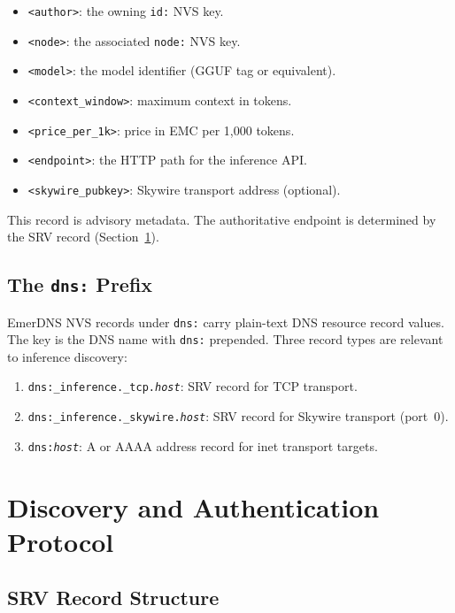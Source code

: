 \documentclass[11pt,a4paper]{article}
\theoremstyle{definition}
\begin{document}
\begin{itemize}
  \item \texttt{<author>}: the owning \texttt{id:} NVS key.
  \item \texttt{<node>}: the associated \texttt{node:} NVS key.
  \item \texttt{<model>}: the model identifier (GGUF tag or equivalent).
  \item \texttt{<context\_window>}: maximum context in tokens.
  \item \texttt{<price\_per\_1k>}: price in EMC per 1,000 tokens.
  \item \texttt{<endpoint>}: the HTTP path for the inference API.
  \item \texttt{<skywire\_pubkey>}: Skywire transport address (optional).
\end{itemize}

This record is advisory metadata.  The authoritative endpoint is determined by
the SRV record (Section~\ref{sec:discovery}).

\subsection{The \texttt{dns:} Prefix}

EmerDNS NVS records under \texttt{dns:} carry plain-text DNS resource record
values.  The key is the DNS name with \texttt{dns:} prepended.  Three record
types are relevant to inference discovery:

\begin{enumerate}
  \item \texttt{dns:\_inference.\_tcp.\textit{host}}: SRV record for TCP transport.
  \item \texttt{dns:\_inference.\_skywire.\textit{host}}: SRV record for Skywire transport (port~0).
  \item \texttt{dns:\textit{host}}: A or AAAA address record for inet transport targets.
\end{enumerate}

\section{Discovery and Authentication Protocol}
\label{sec:discovery}

\subsection{SRV Record Structure}
\end{document}
